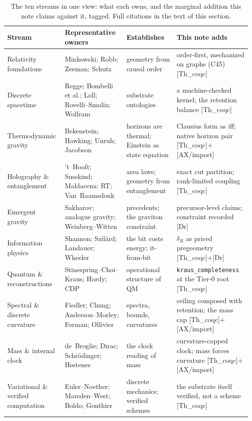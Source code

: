 \documentclass[10pt,twocolumn]{article}
\theoremstyle{definition}
\newcommand{\Thq}{\textsf{[Th\_coqc]}}
\newcommand{\Dr}{\textsf{[Dr]}}
\newcommand{\Ax}{\textsf{[AX/import]}}
\newcommand{\code}[1]{\texttt{#1}}
\begin{document}
\begin{table}[t]
\centering\footnotesize
\begin{tabularx}{\textwidth}{@{}lYYY@{}}
\toprule
Stream & Representative owners & Establishes & This note adds\\
\midrule
Relativity foundations & Minkowski; Robb; Zeeman; Schutz & geometry from causal order & order-first, mechanized on graphs (C45) \Thq\\
Discrete spacetime & Regge; Bombelli et al.; Loll; Rovelli--Smolin; Wolfram & substrate ontologies & a machine-checked kernel; the retention balance \Thq\\
Thermodynamic gravity & Bekenstein; Hawking; Unruh; Jacobson & horizons are thermal; Einstein as state equation & Clausius form as iff; native horizon pair \Thq{}+\Ax\\
Holography \& entanglement & 't~Hooft; Susskind; Maldacena; RT; Van~Raamsdonk & area laws; geometry from entanglement & exact cut partition; rank-limited coupling \Thq\\
Emergent gravity & Sakharov; analogue gravity; Weinberg--Witten & precedents; the graviton constraint & precursor-level claims; constraint recorded \Dr\\
Information physics & Shannon; Szil\'ard; Landauer; Wheeler & the bit costs energy; it-from-bit & $\delta_R$ as priced pregeometry \Thq{}+\Dr\\
Quantum \& reconstructions & Stinespring--Choi--Kraus; Hardy; CDP & operational structure of QM & \code{kraus\_completeness} at the Tier-0 root \Thq\\
Spectral \& discrete curvature & Fiedler; Chung; Anderson--Morley; Forman; Ollivier & spectra, bounds, curvatures & ceiling composed with retention; the mass cap \Thq{}+\Ax\\
Mass \& internal clock & de~Broglie; Dirac; Schr\"odinger; Hestenes & the clock reading of mass & curvature-capped clock; mass forces curvature \Thq{}+\Ax\\
Variational \& verified computation & Euler--Noether; Marsden--West; Boldo; Gonthier & discrete mechanics; verified schemes & the substrate itself verified, not a scheme \Thq\\
\bottomrule
\end{tabularx}
\caption{The ten streams in one view: what each owns, and the marginal addition
this note claims against it, tagged. Full citations in the text of this section.}
\label{tab:streams}
\end{table}
\end{document}

